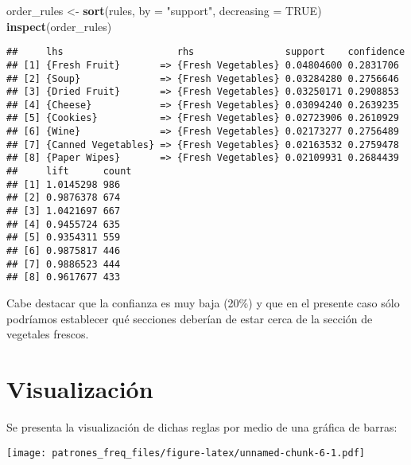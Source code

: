 \documentclass[]{article}
\newenvironment{Shaded}{\begin{snugshade}}{\end{snugshade}}
\newcommand{\KeywordTok}[1]{\textcolor[rgb]{0.13,0.29,0.53}{\textbf{#1}}}
\newcommand{\DataTypeTok}[1]{\textcolor[rgb]{0.13,0.29,0.53}{#1}}
\newcommand{\StringTok}[1]{\textcolor[rgb]{0.31,0.60,0.02}{#1}}
\newcommand{\OtherTok}[1]{\textcolor[rgb]{0.56,0.35,0.01}{#1}}
\newcommand{\OperatorTok}[1]{\textcolor[rgb]{0.81,0.36,0.00}{\textbf{#1}}}
\newcommand{\NormalTok}[1]{#1}
\begin{document}
\begin{Shaded}
\begin{Highlighting}[]
\NormalTok{order_rules <-}\StringTok{ }\KeywordTok{sort}\NormalTok{(rules, }\DataTypeTok{by =} \StringTok{"support"}\NormalTok{, }\DataTypeTok{decreasing =} \OtherTok{TRUE}\NormalTok{)}
\KeywordTok{inspect}\NormalTok{(order_rules)}
\end{Highlighting}
\end{Shaded}

\begin{verbatim}
##     lhs                    rhs                support    confidence
## [1] {Fresh Fruit}       => {Fresh Vegetables} 0.04804600 0.2831706 
## [2] {Soup}              => {Fresh Vegetables} 0.03284280 0.2756646 
## [3] {Dried Fruit}       => {Fresh Vegetables} 0.03250171 0.2908853 
## [4] {Cheese}            => {Fresh Vegetables} 0.03094240 0.2639235 
## [5] {Cookies}           => {Fresh Vegetables} 0.02723906 0.2610929 
## [6] {Wine}              => {Fresh Vegetables} 0.02173277 0.2756489 
## [7] {Canned Vegetables} => {Fresh Vegetables} 0.02163532 0.2759478 
## [8] {Paper Wipes}       => {Fresh Vegetables} 0.02109931 0.2684439 
##     lift      count
## [1] 1.0145298 986  
## [2] 0.9876378 674  
## [3] 1.0421697 667  
## [4] 0.9455724 635  
## [5] 0.9354311 559  
## [6] 0.9875817 446  
## [7] 0.9886523 444  
## [8] 0.9617677 433
\end{verbatim}

Cabe destacar que la confianza es muy baja (20\%) y que en el presente
caso sólo podríamos establecer qué secciones deberían de estar cerca de
la sección de vegetales frescos.

\section{Visualización}\label{visualizacion-1}

Se presenta la visualización de dichas reglas por medio de una gráfica
de barras:

\begin{Shaded}
\end{Shaded}

\texttt{[image: patrones\_freq\_files/figure-latex/unnamed-chunk-6-1.pdf]}
\end{document}
